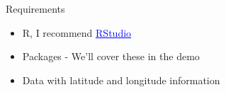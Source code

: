 \documentclass{beamer}
\begin{document}
\begin{frame}{
	\begin{minipage}[t]{0.75\textwidth}
		Requirements
	\end{minipage}
	\hfill
	\begin{minipage}[t]{0.25\textwidth}
		\flushright
	\end{minipage}
}{}
	\begin{itemize}
		\item R, I recommend \href{https://www.rstudio.com/}{\textcolor{blue}{\underline{RStudio}}} 
		\item Packages - We'll cover these in the demo
		\item Data with latitude and longitude information
	\end{itemize}
\end{frame}
\end{document}
